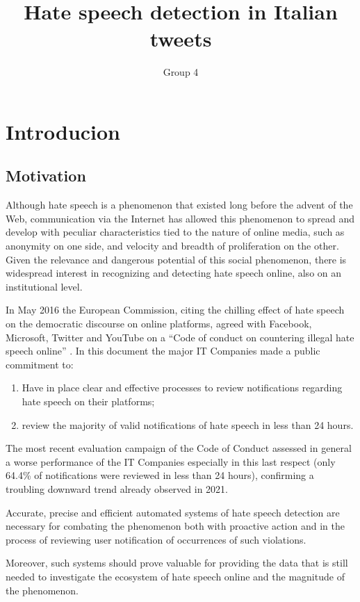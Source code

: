 \documentclass[a4paper, 10pt, twocolumn, DIV=calc]{scrartcl}
\begin{document}
\author{Group 4}
\title{Hate speech detection in Italian tweets}

\maketitle
\section{Introducion}
\subsection{Motivation}
Although hate speech is a phenomenon that existed long before the advent of the Web, communication via the Internet has allowed this phenomenon to spread and develop with peculiar characteristics tied to the nature of online media, such as anonymity on one side, and velocity and breadth of proliferation on the other. Given the relevance and dangerous potential of this social phenomenon, there is widespread interest in recognizing and detecting hate speech online, also on an institutional level.

In May 2016 the European Commission, citing the chilling effect of hate speech on the democratic discourse on online platforms,  agreed with Facebook, Microsoft, Twitter and YouTube on a ``Code of conduct on countering illegal hate speech online'' \cite{european_commission_code}.
In this document the major IT Companies made a public commitment to:
\begin{enumerate}
  \item Have in place clear and effective processes to review notifications regarding hate speech on their platforms;
  \item review the majority of valid notifications of hate speech in less than 24 hours.
\end{enumerate}

The most recent evaluation campaign of the Code of Conduct \cite{reynders_factsheet} assessed in general a worse performance of the IT Companies especially in this last respect (only 64.4\% of notifications were reviewed in less than 24 hours), confirming a troubling downward trend already observed in 2021.

Accurate, precise and efficient automated systems of hate speech detection are necessary for combating the phenomenon both with proactive action and in the process of reviewing user notification of occurrences of such violations.

Moreover, such systems should prove valuable for providing the data that is still needed to investigate the ecosystem of hate speech online and the magnitude of the phenomenon.
\end{document}
